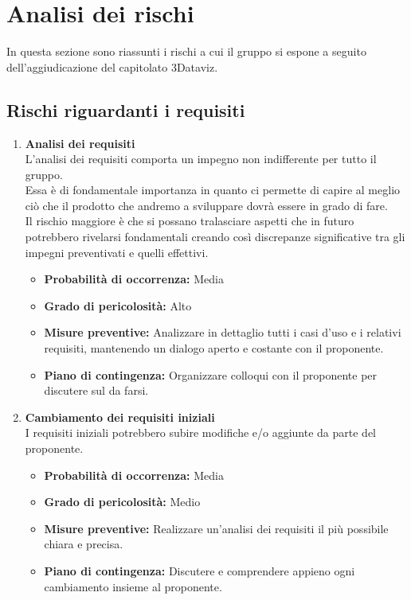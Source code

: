\section{Analisi dei rischi}
In questa sezione sono riassunti i rischi a cui il gruppo si espone a seguito dell'aggiudicazione del capitolato 3Dataviz.

\subsection{Rischi riguardanti i requisiti}

\begin{enumerate}
    \item \textbf{Analisi dei requisiti}\\
    L'analisi dei requisiti comporta un impegno non indifferente per tutto il gruppo.\\
    Essa è di fondamentale importanza in quanto ci permette di capire al meglio ciò che il prodotto che andremo a sviluppare dovrà essere in grado di fare.\\
    Il rischio maggiore è che si possano tralasciare aspetti che in futuro potrebbero rivelarsi fondamentali creando così discrepanze significative tra gli impegni preventivati e quelli effettivi.
    \begin{itemize}
        \item \textbf{Probabilità di occorrenza:} Media
        \item \textbf{Grado di pericolosità:} Alto
        \item \textbf{Misure preventive:} Analizzare in dettaglio tutti i casi d’uso e i relativi requisiti, mantenendo un dialogo aperto e costante con il proponente.
        \item \textbf{Piano di contingenza:} Organizzare colloqui con il proponente per discutere sul da farsi.
    \end{itemize}

    \item \textbf{Cambiamento dei requisiti iniziali}\\
    I requisiti iniziali potrebbero subire modifiche e/o aggiunte da parte del proponente.
    \begin{itemize}
        \item \textbf{Probabilità di occorrenza:} Media
        \item \textbf{Grado di pericolosità:} Medio
        \item \textbf{Misure preventive:} Realizzare un'analisi dei requisiti il più possibile chiara e precisa. 
        \item \textbf{Piano di contingenza:} Discutere e comprendere appieno ogni cambiamento insieme al proponente.
    \end{itemize}
\end{enumerate}


